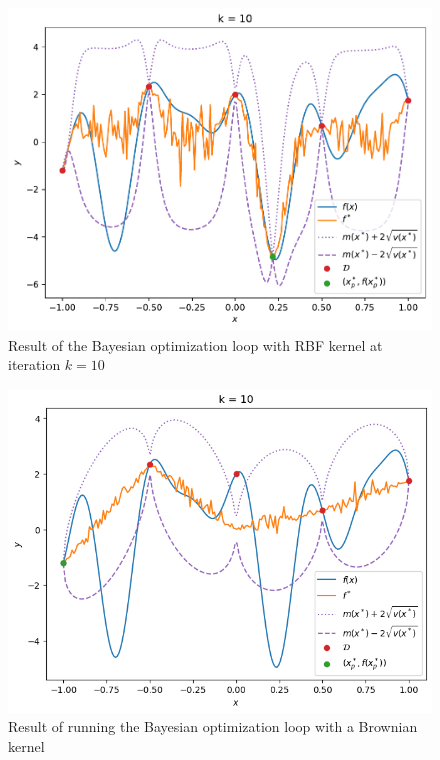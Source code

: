 \begin{figure}%
    \includegraphics[width=\textwidth]{figures/gp/b2-k_10.pdf}
    \caption{Result of the Bayesian optimization loop with RBF kernel at iteration $k = 10$}
\end{figure}
\begin{figure}%
    \includegraphics[width=\textwidth]{figures/gp/Brownian.png}
    \caption{Result of running the Bayesian optimization loop with a Brownian kernel}
\end{figure}

